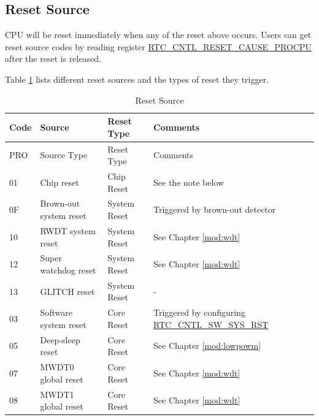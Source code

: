 \documentclass[main\_\_EN.tex]{subfiles}
\begin{document}
\subsection{Reset Source}
CPU will be reset immediately when any of the reset above occurs. Users can get reset source codes by reading register \hyperref[fielddesc:RTCCNTLRESETCAUSEPROCPU]{RTC\_CNTL\_RESET\_CAUSE\_PROCPU} after the reset is released.

Table \ref{table:resetreasons} lists different reset sources and the types of reset they trigger.


\begin{longtable}[c]{ |p{0.8cm}|p{3.8cm}|p{2.7cm}|p{8.7cm}| }
\caption{Reset Source}
    \label{table:resetreasons} \\
        \hline
        \rowcolor{lightgray}
        Code & Source & Reset Type & Comments\\
        \hline
        \endfirsthead
        \hline
       \rowcolor{lightgray}
        PRO  & Source Type& Reset Type & Comments \\
        \hline
        \endhead
        \endfoot
        \hexprefix{}01  & Chip reset & Chip Reset & See the note below \\
        \hline
        \hexprefix{}0F & Brown-out system reset & System Reset & Triggered by brown-out detector\\
        \hline
        \hexprefix{}10  & RWDT system reset & System Reset & See Chapter \ref{mod:wdt} \textit{\nameref{mod:wdt}}  \\
        \hline
        \hexprefix{}12 & Super watchdog reset & System Reset & See Chapter \ref{mod:wdt} \textit{\nameref{mod:wdt}} \\
        \hline
        \hexprefix{}13 & GLITCH reset & System Reset & - \\
        \hline
        \hexprefix{}03 & Software system reset & Core Reset & Triggered by configuring \hyperref[fielddesc:RTCCNTLSWSYSRST]{RTC\_CNTL\_SW\_SYS\_RST} \\
        \hline
        \hexprefix{}05 & Deep-sleep reset & Core Reset & See Chapter \ref{mod:lowpowm} \textit{\nameref{mod:lowpowm}} \\
        \hline
        \hexprefix{}07 & MWDT0 global reset & Core Reset & See Chapter \ref{mod:wdt} \textit{\nameref{mod:wdt}} \\
        \hline
        \hexprefix{}08 & MWDT1 global reset & Core Reset & See Chapter \ref{mod:wdt} \textit{\nameref{mod:wdt}} \\
        \hline

\end{longtable}
\end{document}
